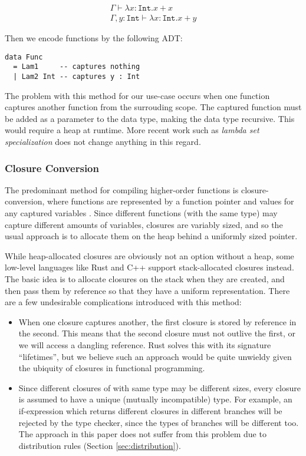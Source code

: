\documentclass[runningheads]{llncs}
\begin{document}
\begin{align}
  \Gamma \vdash \lambda x : \texttt{Int}. x + x \\
  \Gamma , y : \texttt{Int} \vdash \lambda x : \texttt{Int}. x + y
\end{align}

Then we encode functions by the following ADT:

\begin{verbatim}
data Func
  = Lam1     -- captures nothing
  | Lam2 Int -- captures y : Int
\end{verbatim}

The problem with this method for our use-case occurs when one function captures another function from the surrouding scope. The captured function must be added as a parameter to the data type, making the data type recursive. This would require a heap at runtime. More recent work such as \emph{lambda set specialization} \cite{brandon2023better} does not change anything in this regard.

\subsubsection{Closure Conversion}

The predominant method for compiling higher-order functions is closure-conversion, where functions are represented by a function pointer and values for any captured variables \cite{minamide1996typed}. Since different functions (with the same type) may capture different amounts of variables, closures are variably sized, and so the usual approach is to allocate them on the heap behind a uniformly sized pointer.

While heap-allocated closures are obviously not an option without a heap, some low-level languages like Rust and C++ support stack-allocated closures instead. The basic idea is to allocate closures on the stack when they are created, and then pass them by reference so that they have a uniform representation. There are a few undesirable complications introduced with this method:

\begin{itemize}
  \item When one closure captures another, the first closure is stored by reference in the second. This means that the second closure must not outlive the first, or we will access a dangling reference. Rust solves this with its signature ``lifetimes'', but we believe such an approach would be quite unwieldy given the ubiquity of closures in functional programming.
  \item Since different closures of with same type may be different sizes, every closure is assumed to have a unique (mutually incompatible) type. For example, an if-expression which returns different closures in different branches will be rejected by the type checker, since the types of branches will be different too. The approach in this paper does not suffer from this problem due to distribution rules (Section \ref{sec:distribution}).
\end{itemize}
\end{document}

